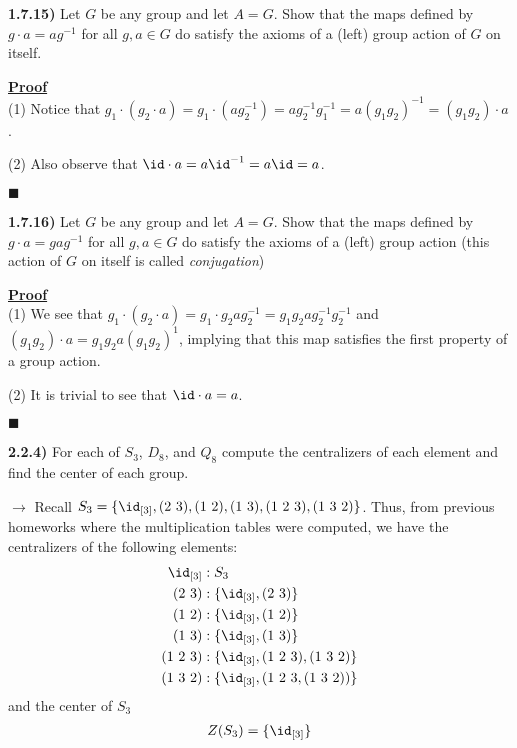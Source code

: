 \documentclass[12pt,a4paper]{article}
\newcommand{\prob}[2]{\textbf{#1)} #2}
\newenvironment{proof}
{
\textbf{\underline{Proof}} \\
}
{
\begin{flushright}
$\blacksquare$
\end{flushright}}
\begin{document}
\prob{1.7.15}{Let $G$ be any group and let $A = G$. Show that the maps defined by $g \cdot a = ag^{-1}$ for all $g,a \in G$ do satisfy the axioms of a (left) group action of $G$ on itself.}

\begin{proof}
(1) Notice that $g_1 \cdot (g_2 \cdot a) = g_1 \cdot (ag_2^{-1}) = ag_2^{-1}g_1^{-1} = a(g_1g_2)^{-1} = (g_1g_2) \cdot a$.

(2) Also observe that $\id \cdot a = a\id^{-1} = a\id = a$.
\end{proof}

\prob{1.7.16}{Let $G$ be any group and let $A = G$. Show that the maps defined by $g \cdot a = gag^{-1}$ for all $g,a \in G$ do satisfy the axioms of a (left) group action (this action of $G$ on itself is called \textit{conjugation})}

\begin{proof}
(1) We see that $g_1 \cdot (g_2 \cdot a) = g_1 \cdot g_2ag_2^{-1} = g_1g_2ag_2^{-1}g_2^{-1}$ and $(g_1g_2) \cdot a = g_1g_2a(g_1g_2)^{1}$, implying that this map satisfies the first property of a group action.

(2) It is trivial to see that $\id \cdot a = a$.
\end{proof}

\prob{2.2.4}{For each of $S_3$, $D_8$, and $Q_8$ compute the centralizers of each element and find the center of each group.}

$\rightarrow$ Recall $S_3 = \{\id_{[3]},(2~3),(1~2),(1~3),(1~2~3),(1~3~2)\}$.
Thus, from previous homeworks where the multiplication tables were computed, we have the centralizers of the following elements:
\begin{align*}
\id_{[3]}&: S_3 \\
(2~3)&: \{\id_{[3]},(2~3)\} \\
(1~2)&: \{\id_{[3]},(1~2)\} \\
(1~3)&: \{\id_{[3]},(1~3)\} \\
(1~2~3)&: \{\id_{[3]},(1~2~3),(1~3~2)\} \\
(1~3~2)&: \{\id_{[3]},(1~2~3,(1~3~2))\}
\end{align*}
and the center of $S_3$
\begin{align*}
Z(S_3) = \{\id_{[3]}\}
\end{align*}
\end{document}
